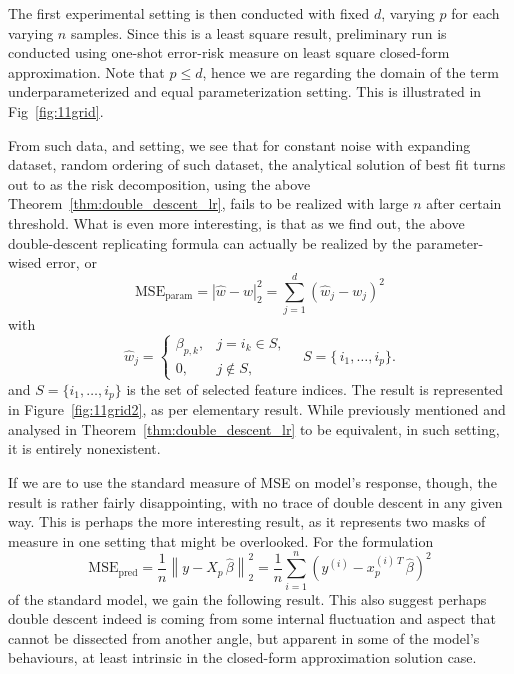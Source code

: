 \documentclass[twoside,10pt]{article}
\begin{document}
The first experimental setting is then conducted with fixed $d$, varying $p$ for each varying $n$ samples. Since this is a least square result, preliminary run is conducted using one-shot error-risk measure on least square closed-form approximation. Note that $p\leq d$, hence we are regarding the domain of the term underparameterized and equal parameterization setting. This is illustrated in Fig~\ref{fig:11grid}.

From such data, and setting, we see that for constant noise with expanding dataset, random ordering of such dataset, the analytical solution of best fit turns out to as the risk decomposition, using the above Theorem~\ref{thm:double_descent_lr}, fails to be realized with large $n$ after certain threshold. What is even more interesting, is that as we find out, the above double-descent replicating formula can actually be realized by the parameter-wised error, or 
\begin{equation}
\mathrm{MSE}_{\mathrm{param}}=\left\lvert \hat w - w \right\rvert _{2}^{2}=
\sum_{j=1}^{d}
\left(
  \hat w_{j} - w_{j}
\right)^{2}
\end{equation}
with 
\begin{equation}
\hat w_{j}
=
\begin{cases}
\beta_{p,k}, & j = i_{k} \in S,\\[6pt]
0,           & j \notin S,
\end{cases}
\quad
S = \{\,i_{1},\dots,i_{p}\}.
\end{equation}
and \(S=\{i_1,\dots,i_p\}\) is the set of selected feature indices. The result is represented in Figure~\ref{fig:11grid2}, as per elementary result. While previously mentioned and analysed in Theorem~\ref{thm:double_descent_lr} to be equivalent, in such setting, it is entirely nonexistent. 

If we are to use the standard measure of MSE on model's response, though, the result is rather fairly disappointing, with no trace of double descent in any given way. This is perhaps the more interesting result, as it represents two masks of measure in one setting that might be overlooked. For the formulation
\begin{equation}
\mathrm{MSE}_{\mathrm{pred}}
=
\frac{1}{n}
\left\lVert
  y - X_{p}\,\hat\beta
\right\rVert_{2}^{2}
=
\frac{1}{n}
\sum_{i=1}^{n}
\left(
  y^{(i)} - x_{p}^{(i)\,T}\,\hat\beta
\right)^{2}
\end{equation}
of the standard model, we gain the following result. This also suggest perhaps double descent indeed is coming from some internal fluctuation and aspect that cannot be dissected from another angle, but apparent in some of the model's behaviours, at least intrinsic in the closed-form approximation solution case. 
\end{document}
